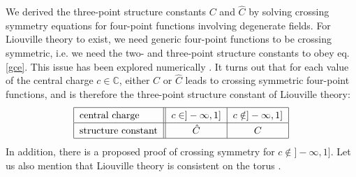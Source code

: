 \documentclass[12pt, a4paper, notitlepage, twoside]{report}
\numberwithin{equation}{section}
\theoremstyle{break}
\begin{document}
We derived the three-point structure constants $C$ and $\hat C$ by solving crossing symmetry equations for four-point functions involving degenerate fields. 
For Liouville theory to exist, we need generic four-point functions to be crossing symmetric, i.e. we need the two- and three-point structure constants to obey eq. \eqref{gce}.
This issue has been explored numerically \cite{rs15}. 
It turns out that for each value of the central charge $c\in\mathbb{C}$, either $C$ or $\hat C$ leads to crossing symmetric four-point functions, and is therefore the three-point structure constant of Liouville theory:
\begin{align}
\renewcommand{\arraystretch}{1.3}
 \begin{tabular}{|l||c|c|}
  \hline
  central charge &  $c\in ]-\infty, 1]$ & $c\notin ]-\infty, 1]$
  \\
  \hline
  structure constant & $\hat C$  & $C$ 
  \\
  \hline
 \end{tabular}
 \label{ccr}
\end{align}
In addition, there is a proposed proof \cite{tes03b} of crossing symmetry for $c\notin ]-\infty, 1]$.
Let us also mention that Liouville theory is consistent on the torus \cite{hjs09, rs15}. 
\end{document}
